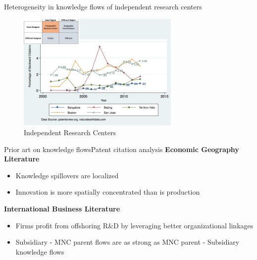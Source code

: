 \documentclass{beamer}
\begin{document}
\begin{frame}{Heterogeneity in knowledge flows of independent research centers}
\begin{figure}[h]
\begin{centering}
  \includegraphics[width=0.7\textwidth]{SMSSameRegionSameAssigneeFlows.png}
  \caption{Independent Research Centers}
   \label{fig:SMSSameRegionSameAssigneeFlows}
\end{centering}
\end{figure}
\end{frame}

\begin{frame}{Prior art on knowledge flows}{Patent citation analysis}
\textbf{Economic Geography Literature}
\begin{itemize}
\item{Knowledge spillovers are localized \citep*{Jaffe1993}}
\item{Innovation is more spatially concentrated than is production \citep{Feldman1994a}}
\end{itemize}

\textbf{International Business Literature}
\begin{itemize}
\item{Firms profit from offshoring R\&D by leveraging better organizational linkages \citep*{Zhao2006}}
\item{Subsidiary - MNC parent flows are as strong as MNC parent - Subsidiary knowledge flows \citep{Singh2007}}
\end{itemize}
\end{frame}
\end{document}
